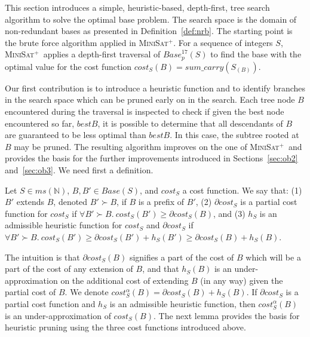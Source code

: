 \documentclass[envcountsame]{llncs}
\newcommand\minisatp{\textsc{MiniSat$^+$}}
\newcommand{\Base}{\mathit{Base}}
\newcommand{\intMultiSet}{\mathit{ms(\mathbb{N})}}
\newcommand{\sumCarry}{\mathit{sum\_carry}}
\newcommand{\cost}{\mathit{cost}}
\begin{document}
This section introduces a simple, heuristic-based, depth-first, tree
search algorithm to solve the optimal base problem. The search space
is the domain of non-redundant bases as presented in
Definition~\ref{def:nrb}.
The starting point is the brute force algorithm applied in \minisatp.
For a sequence of integers $S$, \minisatp\ applies a depth-first
traversal of $\Base_p^{17}(S)$ to find the base with the optimal value
for the cost function $\cost_S(B)= \sumCarry(S_{(B)})$.

Our first contribution is to introduce a heuristic function and to identify
branches in the search space which can be pruned early on in the
search. Each tree node $B$ encountered during the traversal is
inspected to check if given the best node encountered so far, $bestB$,
it is possible to determine that all descendants of $B$ are guaranteed
to be less optimal than $bestB$. In this case, the subtree rooted at
$B$ may be pruned.
The resulting algorithm improves on the one of \minisatp\ and
provides the basis for the further improvements introduced in
Sections~\ref{sec:ob2} and~\ref{sec:ob3}.
We need first a definition.

\begin{definition}
  Let $S\in\intMultiSet$, $B,B'\in\Base(S)$, and $\cost_S$ a cost
  function. We say that: 
(1) $B'$ extends $B$, denoted $B'\succ B$, if $B$ is a prefix of
  $B'$, 
(2) $\partial \cost_S$ is a partial cost function for $\cost_S$ if
  $\forall B'\succ B. ~\cost_S(B') \geq \partial \cost_S(B)$, and
(3) $h_S$ is an admissible heuristic function for $\cost_S$ and
  $\partial \cost_S$ if $\forall B'\succ B.  ~\cost_S(B')
  \geq \partial \cost_S(B') + h_S(B') \geq \partial \cost_S(B) +
  h_S(B) $.
\end{definition}
The intuition is that $\partial \cost_S(B)$ signifies a part of the
cost of $B$ which will be a part of the cost of any extension of $B$,
and that $h_S(B)$ is an under-approximation on the additional cost of
extending $B$ (in any way) given the partial cost of $B$.
We denote $\cost^\alpha_S(B)=\partial \cost_S(B) + h_S(B)$. If
$\partial \cost_S$ is a partial cost function and $h_S$ is an
admissible heuristic function, then $\cost^\alpha_S(B)$ is an
under-approximation of $\cost_S(B)$.
The next lemma provides the basis for heuristic pruning using the
three cost functions introduced above.
\end{document}
